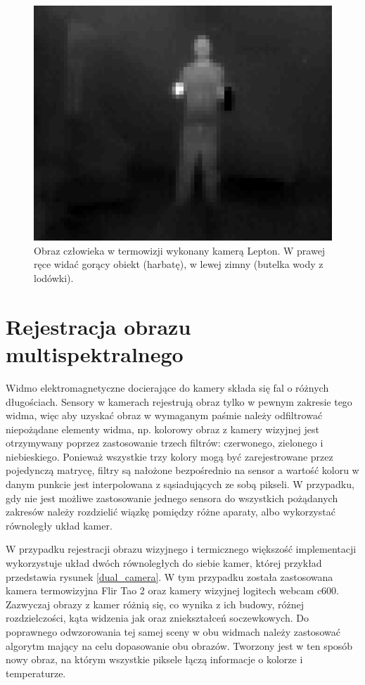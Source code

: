 

\begin{figure}
\centering
\includegraphics[width=0.5\linewidth]{images/leptonTermalImage.png}
\caption[Obraz człowieka w termowizji wykonany kamerą Lepton.]{Obraz człowieka w termowizji wykonany kamerą Lepton. W prawej ręce widać gorący obiekt (harbatę), w lewej zimny (butelka wody z lodówki).}
\label{fig:leptonTermalImage}
\end{figure}



\section{Rejestracja obrazu multispektralnego}

Widmo elektromagnetyczne docierające do kamery składa się fal o różnych długościach. Sensory w kamerach rejestrują obraz tylko w pewnym zakresie tego widma, więc aby uzyskać obraz w wymaganym paśmie należy odfiltrować niepożądane elementy widma, np. kolorowy obraz z kamery wizyjnej jest otrzymywany poprzez zastosowanie trzech filtrów: czerwonego, zielonego i niebieskiego. Ponieważ wszystkie trzy kolory mogą być zarejestrowane przez pojedynczą matrycę, filtry są nałożone bezpośrednio na sensor a wartość koloru w danym punkcie jest interpolowana z sąsiadujących ze sobą pikseli. W przypadku, gdy nie jest możliwe zastosowanie jednego sensora do wszystkich pożądanych zakresów należy rozdzielić wiązkę pomiędzy różne aparaty, albo wykorzystać równoległy układ kamer. 

W przypadku rejestracji obrazu wizyjnego i termicznego większość implementacji wykorzystuje układ dwóch równoległych do siebie kamer, której przykład przedstawia rysunek \ref{dual_camera}. W tym przypadku została zastosowana kamera termowizyjna Flir Tao 2 oraz kamery wizyjnej logitech webcam c600. %
Zazwyczaj obrazy z kamer różnią się, co wynika z ich budowy, różnej rozdzielczości, kąta widzenia jak oraz zniekształceń soczewkowych.
Do poprawnego odwzorowania tej samej sceny w obu widmach należy zastosować algorytm mający na celu dopasowanie obu obrazów. Tworzony jest w ten sposób nowy obraz, na którym wszystkie piksele łączą informacje o kolorze i temperaturze.

